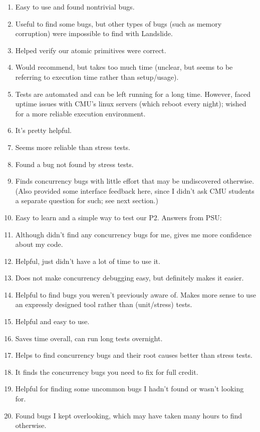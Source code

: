 \begin{enumerate}
	\item Easy to use and found nontrivial bugs.
	\item Useful to find some bugs, but other types of bugs (such as memory corruption) were impossible to find with Landslide.
	\item Helped verify our atomic primitives were correct.
	\item Would recommend, but takes too much time (unclear, but seems to be referring to execution time rather than setup/usage).
	\item Tests are automated and can be left running for a long time.
		However, faced uptime issues with CMU's linux servers (which reboot every night);
		wished for a more reliable execution environment.
	\item It's pretty helpful. %
	\item Seems more reliable than stress tests.
	\item Found a bug not found by stress tests.
	\item Finds concurrency bugs with little effort that may be undiscovered otherwise.
		(Also provided some interface feedback here, since I didn't ask CMU students a separate question for such;
		see next section.)
	\item Easy to learn and a simple way to test our P2.
Answers from PSU:
	\item Although didn't find any concurrency bugs for me, gives me more confidence about my code.
	\item Helpful, just didn't have a lot of time to use it.
	\item Does not make concurrency debugging easy, but definitely makes it easier.
	\item Helpful to find bugs you weren't previously aware of.
		Makes more sense to use an expressly designed tool rather than (unit/stress) tests.
	\item Helpful and easy to use.
	\item Saves time overall, can run long tests overnight.
	\item Helps to find concurrency bugs and their root causes better than stress tests.
	\item It finds the concurrency bugs you need to fix for full credit.
	\item Helpful for finding some uncommon bugs I hadn't found or wasn't looking for.
	\item Found bugs I kept overlooking, which may have taken many hours to find otherwise.

\end{enumerate}
